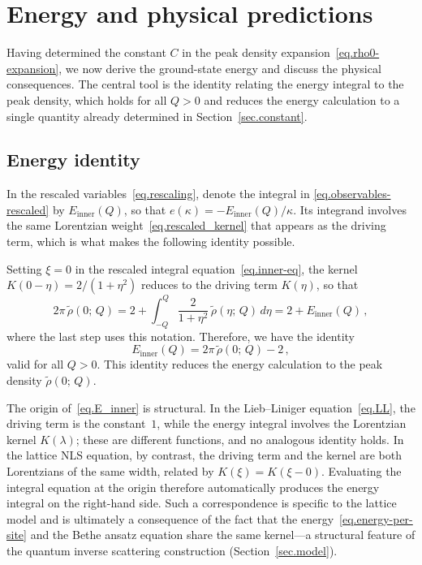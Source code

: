 \documentclass[11pt,a4paper]{article}
\theoremstyle{definition}
\begin{document}
\section{Energy and physical predictions}
\label{sec.observables}

Having determined the constant $C$ in the peak density expansion~\eqref{eq.rho0-expansion}, we now derive the ground-state energy and discuss the physical consequences.
The central tool is the identity relating the energy integral to the peak density, which holds for all $Q > 0$ and reduces the energy calculation to a single quantity already determined in Section~\ref{sec.constant}.

\subsection{Energy identity}
\label{sec.energy-identity}

In the rescaled variables~\eqref{eq.rescaling}, denote the integral in
\eqref{eq.observables-rescaled} by $E_{\mathrm{inner}}(Q)$, so that
$e(\kappa)=-E_{\mathrm{inner}}(Q)/\kappa$.  Its integrand involves the same
Lorentzian weight~\eqref{eq.rescaled_kernel} that
appears as the driving term, which is what makes the following identity possible.

Setting $\xi = 0$ in the rescaled integral equation~\eqref{eq.inner-eq}, the kernel $K(0-\eta) = 2/(1+\eta^2)$ reduces to the driving term $K(\eta)$, so that
\begin{equation}
  2\pi\,\tilde\rho(0;\,Q)
  = 2
  + \int_{-Q}^{Q}\frac{2}{1+\eta^2}\,\tilde\rho(\eta;\,Q)\,d\eta
  = 2 + E_{\mathrm{inner}}(Q)\,,
\end{equation}
where the last step uses this notation. Therefore, we have the identity
\begin{equation}\label{eq.E_inner}
  E_{\mathrm{inner}}(Q) = 2\pi\,\tilde\rho(0;\,Q) - 2\,,
\end{equation}
valid for all $Q > 0$.  This identity reduces the energy calculation to the peak density $\tilde\rho(0;\,Q)$.

The origin of~\eqref{eq.E_inner} is structural.  In the Lieb--Liniger equation~\eqref{eq.LL}, the driving term is the constant~$1$, while the energy integral involves the Lorentzian kernel $K(\lambda)$; these are different functions, and no analogous identity holds.  In the lattice NLS equation, by contrast, the driving term and the kernel are both Lorentzians of the same width, related by $K(\xi) = K(\xi - 0)$.  Evaluating the integral equation at the origin therefore automatically produces the energy integral on the right-hand side.  Such a correspondence is specific to the lattice model and is ultimately a consequence of the fact that the energy~\eqref{eq.energy-per-site} and the Bethe ansatz equation share the same kernel---a structural feature of the quantum inverse scattering construction (Section~\ref{sec.model}).
\end{document}

